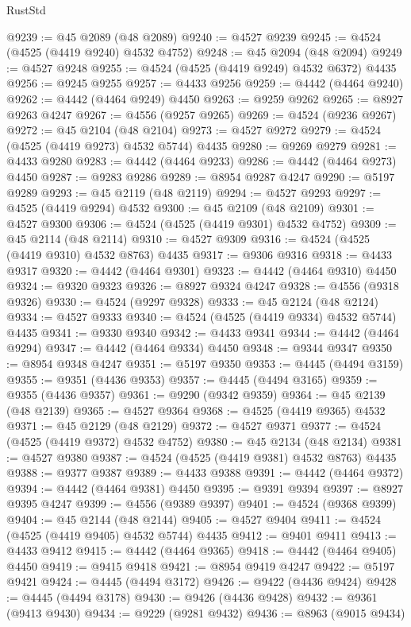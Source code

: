 \begin{lexlean}{RustStd}
\begin{coremodule}
@9239 := @45 @2089 (@48 @2089)
@9240 := @4527 @9239
@9245 := @4524 (@4525 (@4419 @9240) @4532 @4752)
@9248 := @45 @2094 (@48 @2094)
@9249 := @4527 @9248
@9255 := @4524 (@4525 (@4419 @9249) @4532 @6372) @4435
@9256 := @9245 @9255
@9257 := @4433 @9256
@9259 := @4442 (@4464 @9240)
@9262 := @4442 (@4464 @9249) @4450
@9263 := @9259 @9262
@9265 := @8927 @9263 @4247
@9267 := @4556 (@9257 @9265)
@9269 := @4524 (@9236 @9267)
@9272 := @45 @2104 (@48 @2104)
@9273 := @4527 @9272
@9279 := @4524 (@4525 (@4419 @9273) @4532 @5744) @4435
@9280 := @9269 @9279
@9281 := @4433 @9280
@9283 := @4442 (@4464 @9233)
@9286 := @4442 (@4464 @9273) @4450
@9287 := @9283 @9286
@9289 := @8954 @9287 @4247
@9290 := @5197 @9289
@9293 := @45 @2119 (@48 @2119)
@9294 := @4527 @9293
@9297 := @4525 (@4419 @9294) @4532
@9300 := @45 @2109 (@48 @2109)
@9301 := @4527 @9300
@9306 := @4524 (@4525 (@4419 @9301) @4532 @4752)
@9309 := @45 @2114 (@48 @2114)
@9310 := @4527 @9309
@9316 := @4524 (@4525 (@4419 @9310) @4532 @8763) @4435
@9317 := @9306 @9316
@9318 := @4433 @9317
@9320 := @4442 (@4464 @9301)
@9323 := @4442 (@4464 @9310) @4450
@9324 := @9320 @9323
@9326 := @8927 @9324 @4247
@9328 := @4556 (@9318 @9326)
@9330 := @4524 (@9297 @9328)
@9333 := @45 @2124 (@48 @2124)
@9334 := @4527 @9333
@9340 := @4524 (@4525 (@4419 @9334) @4532 @5744) @4435
@9341 := @9330 @9340
@9342 := @4433 @9341
@9344 := @4442 (@4464 @9294)
@9347 := @4442 (@4464 @9334) @4450
@9348 := @9344 @9347
@9350 := @8954 @9348 @4247
@9351 := @5197 @9350
@9353 := @4445 (@4494 @3159)
@9355 := @9351 (@4436 @9353)
@9357 := @4445 (@4494 @3165)
@9359 := @9355 (@4436 @9357)
@9361 := @9290 (@9342 @9359)
@9364 := @45 @2139 (@48 @2139)
@9365 := @4527 @9364
@9368 := @4525 (@4419 @9365) @4532
@9371 := @45 @2129 (@48 @2129)
@9372 := @4527 @9371
@9377 := @4524 (@4525 (@4419 @9372) @4532 @4752)
@9380 := @45 @2134 (@48 @2134)
@9381 := @4527 @9380
@9387 := @4524 (@4525 (@4419 @9381) @4532 @8763) @4435
@9388 := @9377 @9387
@9389 := @4433 @9388
@9391 := @4442 (@4464 @9372)
@9394 := @4442 (@4464 @9381) @4450
@9395 := @9391 @9394
@9397 := @8927 @9395 @4247
@9399 := @4556 (@9389 @9397)
@9401 := @4524 (@9368 @9399)
@9404 := @45 @2144 (@48 @2144)
@9405 := @4527 @9404
@9411 := @4524 (@4525 (@4419 @9405) @4532 @5744) @4435
@9412 := @9401 @9411
@9413 := @4433 @9412
@9415 := @4442 (@4464 @9365)
@9418 := @4442 (@4464 @9405) @4450
@9419 := @9415 @9418
@9421 := @8954 @9419 @4247
@9422 := @5197 @9421
@9424 := @4445 (@4494 @3172)
@9426 := @9422 (@4436 @9424)
@9428 := @4445 (@4494 @3178)
@9430 := @9426 (@4436 @9428)
@9432 := @9361 (@9413 @9430)
@9434 := @9229 (@9281 @9432)
@9436 := @8963 (@9015 @9434)

\end{coremodule}
\end{lexlean}
